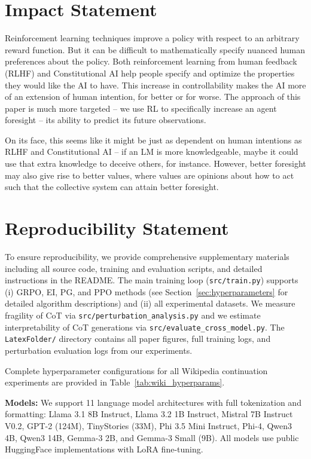 \documentclass{article}
\begin{document}
\section{Impact Statement}
\label{sec:ethics}
Reinforcement learning techniques improve a policy with respect to an arbitrary reward function. But it can be difficult to mathematically specify nuanced human preferences about the policy. Both reinforcement learning from human feedback (RLHF) \citep{christiano2023deepreinforcementlearninghuman} and Constitutional AI \citep{bai2022constitutional} help people specify and optimize the properties they would like the AI to have. This increase in controllability makes the AI more of an extension of human intention, for better or for worse. The approach of this paper is much more targeted -- we use RL to specifically increase an agent foresight -- its ability to predict its future observations. 

On its face, this seems like it might be just as dependent on human intentions as RLHF and Constitutional AI -- if an LM is more knowledgeable, maybe it could use that extra knowledge to deceive others, for instance. However, better foresight may also give rise to better values, where values are opinions about how to act such that the collective system can attain better foresight.

\section{Reproducibility Statement}
To ensure reproducibility, we provide comprehensive supplementary materials including all source code, training and evaluation scripts, and detailed instructions in the README. The main training loop (\texttt{src/train.py}) supports (i) GRPO, EI, PG, and PPO methods (see Section~\ref{sec:hyperparameters} for detailed algorithm descriptions) and (ii) all experimental datasets. We measure fragility of CoT via \texttt{src/perturbation\_analysis.py} and we estimate interpretability of CoT generations via \texttt{src/evaluate\_cross\_model.py}. The \texttt{LatexFolder/} directory contains all paper figures, full training logs, and perturbation evaluation logs from our experiments.

Complete hyperparameter configurations for all Wikipedia continuation experiments are provided in Table~\ref{tab:wiki_hyperparams}.

\textbf{Models:} We support 11 language model architectures with full tokenization and formatting: Llama 3.1 8B Instruct, Llama 3.2 1B Instruct, Mistral 7B Instruct V0.2, GPT-2 (124M), TinyStories (33M), Phi 3.5 Mini Instruct, Phi-4, Qwen3 4B, Qwen3 14B, Gemma-3 2B, and Gemma-3 Small (9B). All models use public HuggingFace implementations with LoRA fine-tuning.
\end{document}
